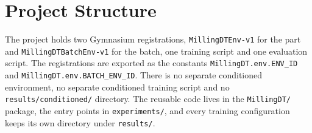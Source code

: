 \documentclass[11pt,a4paper]{article}
\begin{document}
\section{Project Structure}
\label{app:structure}

The project holds two Gymnasium registrations, \texttt{MillingDTEnv-v1} for the part and \texttt{MillingDTBatchEnv-v1} for the batch, one training script and one evaluation script. The registrations are exported as the constants \texttt{MillingDT.env.\allowbreak ENV\_ID} and \texttt{MillingDT.env.\allowbreak BATCH\_ENV\_ID}. There is no separate conditioned environment, no separate conditioned training script and no \texttt{results/conditioned/} directory. The reusable code lives in the \texttt{MillingDT/} package, the entry points in \texttt{experiments/}, and every training configuration keeps its own directory under \texttt{results/}.
\end{document}

